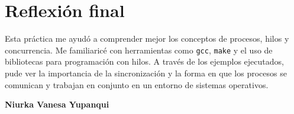 \documentclass[11pt]{article}
\begin{document}
\section*{Reflexión final}
Esta práctica me ayudó a comprender mejor los conceptos de procesos, hilos y concurrencia. Me familiaricé con herramientas como \texttt{gcc}, \texttt{make} y el uso de bibliotecas para programación con hilos. A través de los ejemplos ejecutados, pude ver la importancia de la sincronización y la forma en que los procesos se comunican y trabajan en conjunto en un entorno de sistemas operativos.

\vspace{1cm}
\begin{flushright}
    \textbf{Niurka Vanesa Yupanqui}
\end{flushright}
\end{document}
